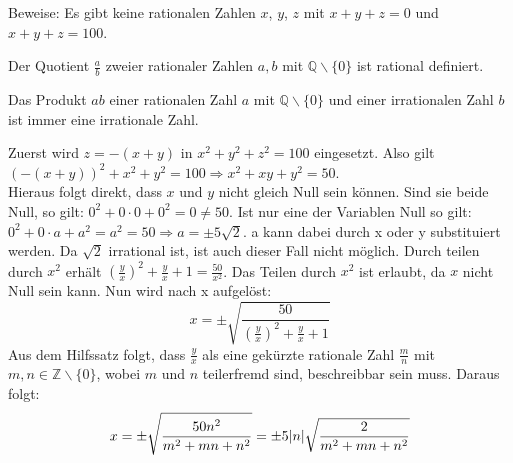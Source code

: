 \documentclass[10pt, a4paper]{amsart}
\makeatletter
\renewenvironment{proof}[1][\proofname]{\par
\pushQED{\qed}%
\normalfont \topsep6\p@\@plus6\p@\relax
\trivlist
\item\relax
{\bfseries#1}\hspace\labelsep\ignorespaces
}{%
\popQED\endtrivlist\@endpefalse
}
\newenvironment{proof thm}[1]{
\begin{proof}[\proofname~(#1)]}{\end{proof}}
\makeatother
\begin{document}
\newpage
\begin{aufgabe}
  Beweise: Es gibt keine rationalen Zahlen $x$, $y$, $z$ mit $x + y + z = 0$ und
  $x + y + z = 100$.
\end{aufgabe}
\begin{lemma}\label{sec2:rational1}
  Der Quotient $\frac{a}{b}$ zweier rationaler Zahlen $a,b$ mit $\mathbb{Q}\backslash\{0\}$ ist rational definiert.\\
\end{lemma}
\begin{lemma}\label{sec2:rational2}
  Das Produkt $ ab $ einer rationalen Zahl $a$ mit $\mathbb{Q}\backslash\{0\}$
  und einer irrationalen Zahl $b$ ist immer eine irrationale Zahl.
\end{lemma}
\begin{proof}
  Zuerst wird $z = -(x+y)$ in $x^2+y^2+z^2 = 100$ eingesetzt. Also gilt
  $(-(x+y))^2+x^2+y^2 = 100 \Rightarrow x^2+xy+y^2=50$.\\
  Hieraus folgt direkt, dass $x$ und $y$ nicht gleich Null sein können. Sind sie
  beide Null, so gilt: $0^2+0\cdot0+0^2=0\neq50$. Ist nur eine der Variablen
  Null so gilt: $0^2+0\cdot a+a^2=a^2=50\Rightarrow a = \pm5\sqrt{2}$. a kann
  dabei durch x oder y substituiert werden. Da $\sqrt{2}$ irrational ist, ist
  auch dieser Fall nicht möglich. Durch teilen durch $x^2$ erhält
  $(\frac{y}{x})^2+\frac{y}{x}+1=\frac{50}{x^2}$. Das Teilen durch $x^2$ ist
  erlaubt, da $x$ nicht Null sein kann. Nun wird nach x aufgelöst:
  \[x=\pm\sqrt{\dfrac{50}{(\frac{y}{x})^2+\frac{y}{x}+1}}\] Aus dem Hilfssatz
  folgt, dass $\frac{y}{x}$ als eine gekürzte rationale Zahl $\frac{m}{n}$ mit
  $m,n\in\mathbb{Z}\backslash\{0\}$, wobei $m$ und $n$ teilerfremd sind,
  beschreibbar sein muss. Daraus folgt:
  \[x=\pm\sqrt{\dfrac{50n^2}{m^2+m n+n^2}}= \pm5\abs{n}\sqrt{\dfrac{2}{m^2+m
        n+n^2}}\]


\end{proof}
\end{document}
